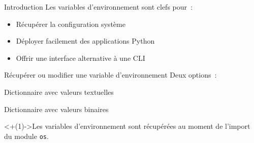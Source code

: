 \begin{frame}{Introduction}
  Les variables d'environnement sont clefs pour~:

  \begin{itemize}[<+(1)->]
    \item Récupérer la configuration système
    \item Déployer facilement des applications Python
    \item Offrir une interface alternative à une CLI
  \end{itemize}
\end{frame}

\begin{frame}{Récupérer ou modifier une variable d'environnement}
  Deux options~:

  \begin{description}[<+(1)->]
    \item[\texttt{os.environ}] Dictionnaire avec valeurs textuelles
    \item[\texttt{os.environb}] Dictionnaire avec valeurs binaires
  \end{description}

  \onslide<+(1)->{Les variables d'environnement sont récupérées au moment de l'import du module \texttt{os}.}
\end{frame}
